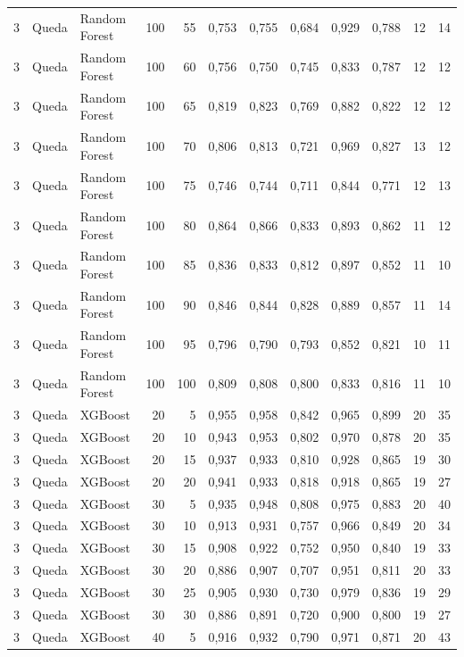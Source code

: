 \begin{longtable}{@{}rllrrrrrrrrr@{}}
3 & Queda & Random Forest & 100 & 55 & 0,753 & 0,755 & 0,684 & 0,929 & 0,788 & 12 & 14 \\
3 & Queda & Random Forest & 100 & 60 & 0,756 & 0,750 & 0,745 & 0,833 & 0,787 & 12 & 12 \\
3 & Queda & Random Forest & 100 & 65 & 0,819 & 0,823 & 0,769 & 0,882 & 0,822 & 12 & 12 \\
3 & Queda & Random Forest & 100 & 70 & 0,806 & 0,813 & 0,721 & 0,969 & 0,827 & 13 & 12 \\
3 & Queda & Random Forest & 100 & 75 & 0,746 & 0,744 & 0,711 & 0,844 & 0,771 & 12 & 13 \\
3 & Queda & Random Forest & 100 & 80 & 0,864 & 0,866 & 0,833 & 0,893 & 0,862 & 11 & 12 \\
3 & Queda & Random Forest & 100 & 85 & 0,836 & 0,833 & 0,812 & 0,897 & 0,852 & 11 & 10 \\
3 & Queda & Random Forest & 100 & 90 & 0,846 & 0,844 & 0,828 & 0,889 & 0,857 & 11 & 14 \\
3 & Queda & Random Forest & 100 & 95 & 0,796 & 0,790 & 0,793 & 0,852 & 0,821 & 10 & 11 \\
3 & Queda & Random Forest & 100 & 100 & 0,809 & 0,808 & 0,800 & 0,833 & 0,816 & 11 & 10 \\
3 & Queda & XGBoost & 20 & 5 & 0,955 & 0,958 & 0,842 & 0,965 & 0,899 & 20 & 35 \\
3 & Queda & XGBoost & 20 & 10 & 0,943 & 0,953 & 0,802 & 0,970 & 0,878 & 20 & 35 \\
3 & Queda & XGBoost & 20 & 15 & 0,937 & 0,933 & 0,810 & 0,928 & 0,865 & 19 & 30 \\
3 & Queda & XGBoost & 20 & 20 & 0,941 & 0,933 & 0,818 & 0,918 & 0,865 & 19 & 27 \\
3 & Queda & XGBoost & 30 & 5 & 0,935 & 0,948 & 0,808 & 0,975 & 0,883 & 20 & 40 \\
3 & Queda & XGBoost & 30 & 10 & 0,913 & 0,931 & 0,757 & 0,966 & 0,849 & 20 & 34 \\
3 & Queda & XGBoost & 30 & 15 & 0,908 & 0,922 & 0,752 & 0,950 & 0,840 & 19 & 33 \\
3 & Queda & XGBoost & 30 & 20 & 0,886 & 0,907 & 0,707 & 0,951 & 0,811 & 20 & 33 \\
3 & Queda & XGBoost & 30 & 25 & 0,905 & 0,930 & 0,730 & 0,979 & 0,836 & 19 & 29 \\
3 & Queda & XGBoost & 30 & 30 & 0,886 & 0,891 & 0,720 & 0,900 & 0,800 & 19 & 27 \\
3 & Queda & XGBoost & 40 & 5 & 0,916 & 0,932 & 0,790 & 0,971 & 0,871 & 20 & 43 \\

\end{longtable}
